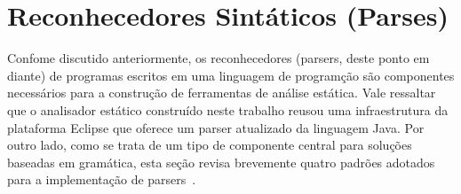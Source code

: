 
 


\section{Reconhecedores Sint\'{a}ticos (Parses)}

Confome discutido anteriormente, os reconhecedores (parsers, deste ponto 
em diante) de programas escritos em uma linguagem de program\c c\~{a}o 
s\~{a}o componentes necess\'{a}rios para a constru\c c\~{a}o de ferramentas de an\'{a}lise 
est\'{a}tica. Vale ressaltar que o analisador est\'{a}tico constru\'{i}do neste trabalho reusou uma infraestrutura 
da plataforma Eclipse que oferece um parser atualizado da linguagem Java. Por outro lado, como 
se trata de um tipo de componente central para solu\c c\~{o}es baseadas em gram\'{a}tica, esta se\c c\~{a}o 
revisa brevemente quatro padr\~{o}es adotados para a implementa\c c\~{a}o de parsers~\cite{Parr:2009:LIP:1823613}.

